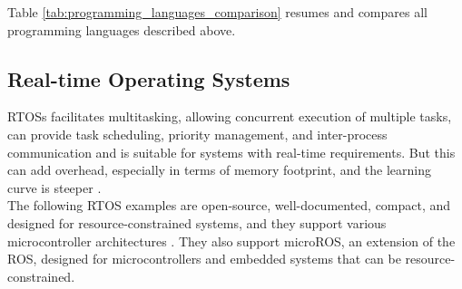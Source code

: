 Table \ref{tab:programming_languages_comparison} resumes and compares all programming languages described above.
\begin{table}[H]
    \centering
    \caption{Comparison of Programming Languages in Embedded Systems}
    \label{tab:programming_languages_comparison}
\end{table}

\subsection{Real-time Operating Systems}
\glspl{RTOS} facilitates multitasking, allowing concurrent execution of multiple tasks, can provide task scheduling, priority management, and inter-process communication and is suitable for systems with real-time requirements.
But this can add overhead, especially in terms of memory footprint, and the learning curve is steeper \cite{RTOS1}.\\
The following \gls{RTOS} examples are open-source, well-documented, compact, and designed for resource-constrained systems, and they support various microcontroller architectures \cite{RTOS5}.
They also support microROS, an extension of the \gls{ROS}, designed for microcontrollers and embedded systems that can be resource-constrained.

